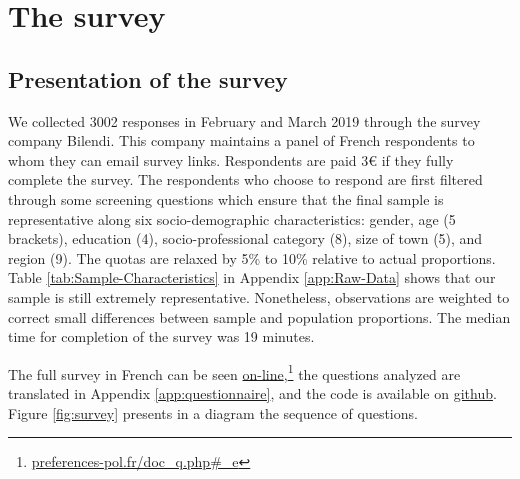 \documentclass[english,5p,authoryear]{elsarticle}
\begin{document}
\section{The survey}\label{sec:survey}

    \subsection{Presentation of the survey}

We collected 3002 responses in February and March 2019 through the survey company Bilendi. This company maintains a panel of French respondents to whom they can email survey links. Respondents are
paid 3\euro{} if they fully complete the survey. The respondents who choose to respond are first filtered through some screening questions which ensure that the final sample is representative along six socio-demographic characteristics: gender, age (5 brackets), education (4), socio-professional category (8), size of town (5), and region (9). The quotas are relaxed by 5\% to 10\% relative to actual proportions. Table \ref{tab:Sample-Characteristics} in Appendix \ref{app:Raw-Data} shows that our sample is still extremely representative. Nonetheless, observations are weighted to correct small differences between sample and population proportions. The median time for completion of the survey was 19 minutes. 

The full survey in French can be seen \href{http://preferences-pol.fr/doc_q.php#_e}{on-line},\footnote{\href{http:\/\/preferences-pol.fr\/doc\_q.php\#\_e}{preferences-pol.fr/doc\_q.php\#\_e}} the questions analyzed are translated in Appendix \ref{app:questionnaire}, and the code is available on \href{https://github.com/bixiou/beliefs_climate_policies}{github}. Figure \ref{fig:survey} presents in a diagram the sequence of  questions.
\end{document}
